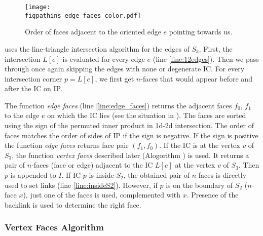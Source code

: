 \begin{figure}%
  \begin{center}        
    \texttt{[image: \\figpathins edge\_faces\_color.pdf]}
  \end{center}
  \caption[Order of faces adjacent to the oriented edge.]
  {Order of faces adjacent to the oriented edge $e$ pointing towards us.}
  \label{fig:edge_faces}
\end{figure}

 uses the line-triangle intersection algorithm for the edges of $S_3$.
First, the intersection $L[e]$ is evaluated for every edge $e$ (line \ref{line:12edges}).  Then we pass through once 
again skipping the edges with none or degenerate IC. For every intersection corner $p=L[e]$, we first get $n$-faces 
that would appear before and after the IC on IP.

The function \emph{edge faces} (line \ref{line:edge_faces}) returns the adjacent faces $f_0$, $f_1$ to the edge $e$
on which the IC lies (see the situation in ). 
The faces are sorted using the sign of the permuted inner product in 1d-2d intersection. The order of faces matches 
the order of sides of IP if the sign is negative. If the sign is positive the function \emph{edge faces} returns face pair $(f_1, f_0)$.
If the IC is at the vertex $v$ of $S_3$, the function \emph{vertex faces} described later (Alogorithm ) is used.
It returns a pair of $n$-faces (face or edge) adjacent to the IC $L[e]$ at the vertex $v$ of $S_3$. 
Then $p$ is appended to $I$. If IC $p$ is inside $S_2$, the obtained pair of $n$-faces is directly used to set links (line \ref{line:insideS2}).
However, if $p$ is on the boundary of $S_2$ ($n$-face $x$), just one of the faces is used, complemented with $x$. Presence of the backlink 
is used to determine the right face. 

\subsubsection{Vertex Faces Algorithm}

